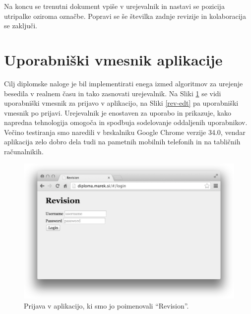 \documentclass[a4paper, 12pt, twoside]{book}
\begin{document}
Na koncu se trenutni dokument vpiše v urejevalnik in nastavi se pozicija utripalke oziroma označbe. Popravi se še številka zadnje revizije in kolaboracija se zaključi.

\newpage

\section{Uporabniški vmesnik aplikacije}

Cilj diplomske naloge je bil implementirati enega izmed algoritmov za urejenje besedila v realnem času in tako zasnovati urejevalnik. Na Sliki \ref{rev-lgn} se vidi uporabniški vmesnik za prijavo v aplikacijo, na Sliki \ref{rev-edt} pa uporabniški vmesnik po prijavi. Urejevalnik je enostaven za uporabo in prikazuje, kako napredna tehnologija omogoča in spodbuja sodelovanje oddaljenih uporabnikov. Večino testiranja smo naredili v brskalniku Google Chrome verzije 34.0, vendar aplikacija zelo dobro dela tudi na pametnih mobilnih telefonih in na tabličnih računalnikih.

\begin{figure}[placement h]
\begin{center}
\includegraphics[width=14cm]{img/revision-login.png}
\end{center}
\caption{Prijava v aplikacijo, ki smo jo poimenovali “Revision”.}
\label{rev-lgn}
\end{figure}

\pagebreak

\vspace*{1cm}
\end{document}
